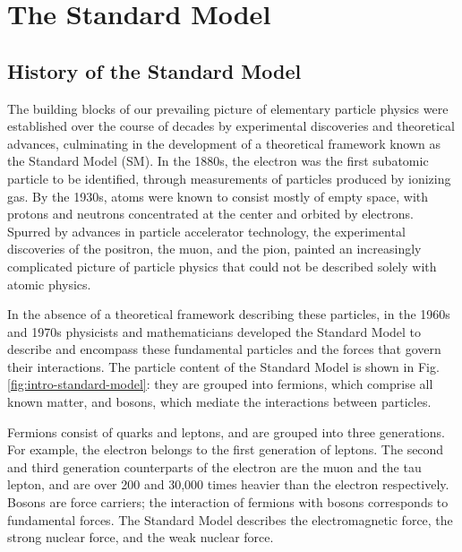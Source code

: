 \documentclass{article}
\begin{document}
\section{The Standard Model}

\subsection{History of the Standard Model}

The building blocks of our prevailing picture of elementary particle physics were established over the course of decades by experimental discoveries and theoretical advances, culminating in the development of a theoretical framework known as the Standard Model (SM). In the 1880s, the electron was the first subatomic particle to be identified, through measurements of particles produced by ionizing gas. By the 1930s, atoms were known to consist mostly of empty space, with protons and neutrons concentrated at the center and orbited by electrons. Spurred by advances in particle accelerator technology, the experimental discoveries of the positron, the muon, and the pion, painted an increasingly complicated picture of particle physics that could not be described solely with atomic physics.

In the absence of a theoretical framework describing these particles, in the 1960s and 1970s physicists and mathematicians developed the Standard Model to describe and encompass these fundamental particles and the forces that govern their interactions. The particle content of the Standard Model is shown in Fig. \ref{fig:intro-standard-model}: they are grouped into fermions, which comprise all known matter, and bosons, which mediate the interactions between particles.

Fermions consist of quarks and leptons, and are grouped into three generations. For example, the electron belongs to the first generation of leptons. The second and third generation counterparts of the electron are the muon and the tau lepton, and are over 200 and 30,000 times heavier than the electron respectively. Bosons are force carriers; the interaction of fermions with bosons corresponds to fundamental forces. The Standard Model describes the electromagnetic force, the strong nuclear force, and the weak nuclear force.
\end{document}
